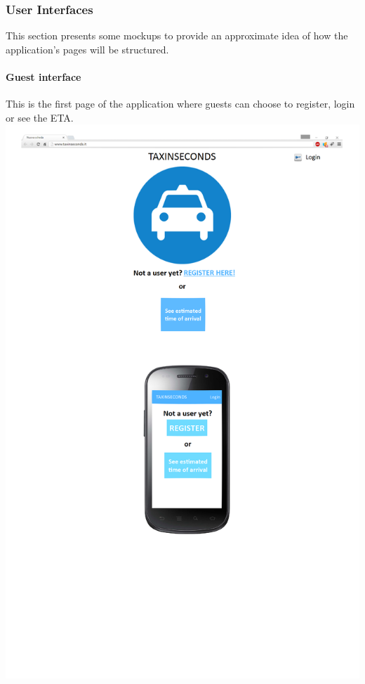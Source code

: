 \documentclass{article}
\begin{document}
\subsubsection{User Interfaces}
This section presents some mockups to provide an approximate idea of how the application's pages will be structured.
\paragraph{Guest interface}
This is the first page of the application where guests can choose to register, login or see the ETA.
\includegraphics{Guest interface}
\clearpage
\end{document}
